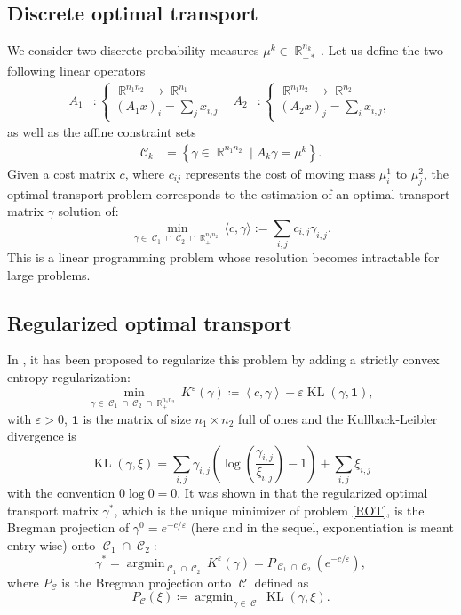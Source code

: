 \documentclass{article} %
\newcommand{\scal}[2]{\left\langle #1 , #2 \right\rangle}
\DeclareMathOperator{\IR}{\mathbb{R}}
\DeclareMathOperator*{\argmin}{argmin}
\DeclareMathOperator{\Ccal}{\mathcal{C}}
\DeclareMathOperator{\KL}{KL}
\renewcommand{\epsilon}{\varepsilon}
\theoremstyle{plain}
\theoremstyle{definition}
\theoremstyle{remark}
\begin{document}
 
\subsection{Discrete optimal transport}
We consider two discrete probability measures $\mu^k \in \IR_{+*}^{n_k}$.
Let us define the two following linear operators
\begin{align*}
A_1 &: \begin{cases}
\IR^{n_1 n_2} \rightarrow \IR^{n_1} \\
(A_1 x)_i = \sum_j x_{i,j}
\end{cases} &
A_2 &: \begin{cases}
\IR^{n_1 n_2} \rightarrow \IR^{n_2}\\
(A_2 x)_j = \sum_i x_{i,j},
\end{cases}
\end{align*}
as well as the affine constraint sets
\begin{align*}
\Ccal_k &= \left\{ \gamma\in\IR^{n_1 n_2} \mid A_k \gamma = \mu^k \right\}.
\end{align*}
Given a cost matrix $c$, where $c_{ij}$ represents the cost of moving mass $\mu^1_i$ to $\mu^2_j$,  the optimal transport problem corresponds to the estimation of an optimal transport matrix $\gamma$ solution of:
$$\min_{\gamma\in\Ccal_1\cap \Ccal_2\cap \IR^{n_1 n_2}_+} \langle c,\gamma\rangle:=\sum_{i,j}c_{i,j}\gamma_{i,j}.$$
This is a linear programming problem whose resolution becomes intractable for large problems.

\subsection{Regularized optimal transport}

In \cite{cuturi13}, it has been proposed to regularize this problem by adding a strictly convex entropy regularization:
\begin{equation}\label{ROT}
\min_{\gamma\in\Ccal_1\cap \Ccal_2\cap \IR^{n_1 n_2}_{+}}K^\epsilon(\gamma) \coloneqq \scal{c}{\gamma} 
+ \epsilon \KL(\gamma,\mathbf{1})
,\end{equation}
with $\epsilon>0$, $\mathbf{1}$ is the matrix of size $n_1\times n_2$ full of ones and the Kullback-Leibler divergence is
\begin{equation}\label{KL}
\KL(\gamma,\xi) = \sum_{i,j} \gamma_{i,j} \left( \log \left( \frac{\gamma_{i,j}}{\xi_{i,j}} \right) -1  \right) + \sum_{i,j} \xi_{i,j}
\end{equation}
with the convention $0 \log 0= 0$. It was shown in \cite{benamou15}  that the regularized optimal transport matrix $\gamma^*$, which is the unique minimizer of problem \eqref{ROT},  is the Bregman projection of $\gamma^0 = e^{-c/\epsilon}$ (here and in the sequel, exponentiation is meant entry-wise) onto $\Ccal_1 \cap \Ccal_2$:
\begin{equation}\label{eq:reg_ot_pb}
\gamma^* = \argmin_{\Ccal_1 \cap \Ccal_2} K^\epsilon(\gamma)= P_{\Ccal_1 \cap \Ccal_2} (e^{-c/\epsilon}),
\end{equation}
where $P_{\Ccal}$ is the  Bregman projection onto $\Ccal$ defined as
\[
P_{\Ccal}(\xi) \coloneqq \argmin_{\gamma \in \Ccal} \KL(\gamma,\xi).
\]
\end{document}

